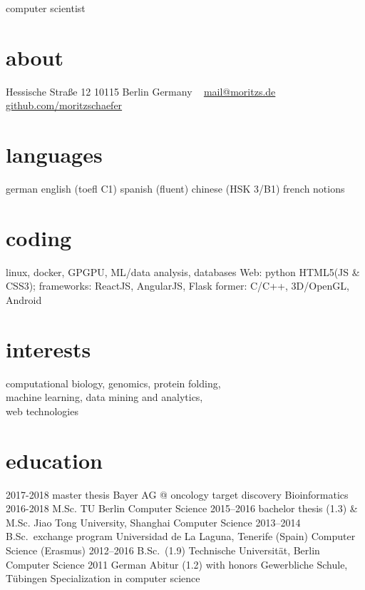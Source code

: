 \documentclass[]{friggeri-cv}
\begin{document}
       {computer scientist}


\begin{aside}
  \section{about}
    Hessische Straße 12
    10115 Berlin
    Germany
    ~
    \href{mailto:mail@moritz.de}{mail@moritzs.de}
    \href{https://github.com/moritzschaefer}{github.com/moritzschaefer}
  \section{languages}
    german
    english (toefl C1)
    spanish (fluent)
    chinese (HSK 3/B1)
    french notions
  \section{coding}
    linux, docker, GPGPU, ML/data analysis, databases
    Web:
    python
    HTML5(JS \& CSS3); frameworks: ReactJS, AngularJS, Flask
    former:
    C/C++, 3D/OpenGL, Android
\end{aside}


\section{interests}

computational biology, genomics, protein folding, \\
machine learning, data mining and analytics, \\
web technologies%

\section{education}

\begin{entrylist}
  \entry
    {2017-2018}
    {master thesis}
    {Bayer AG @ oncology target discovery}
    {Bioinformatics}
  \entry
    {2016-2018}
    {M.Sc.}
    {TU Berlin}
    {Computer Science}
  \entry
    {2015–2016}
    {bachelor thesis (1.3) \& M.Sc.}
    {Jiao Tong University, Shanghai}
    {Computer Science}
  \entry
    {2013–2014}
    {B.Sc.\ exchange program}
    {Universidad de La Laguna, Tenerife (Spain)}
    {Computer Science (Erasmus)}
  \entry
    {2012–2016}
    {B.Sc.\ (1.9)}
    {Technische Universität, Berlin}
    {Computer Science}
  \entry
    {2011}
    {German Abitur (1.2) with honors}
    {Gewerbliche Schule, Tübingen}
    {Specialization in computer science}
\end{entrylist}
\end{document}
